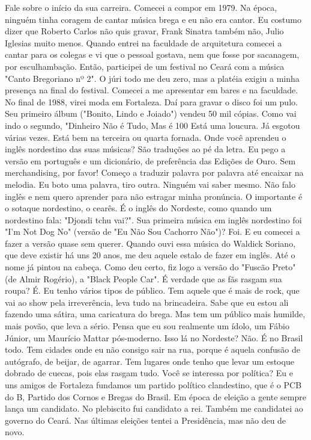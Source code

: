 Fale sobre o início da sua carreira.
Comecei a compor em 1979. Na época, ninguém tinha coragem de cantar música brega e eu não era cantor. Eu costumo dizer que Roberto Carlos não quis gravar, Frank Sinatra também não, Julio Iglesias muito menos. Quando entrei na faculdade de arquitetura comecei a cantar para os colegas e vi que o pessoal gostava, nem que fosse por sacanagem, por esculhambação. Então, participei de um festival no Ceará com a música "Canto Bregoriano nº 2". O júri todo me deu zero, mas a platéia exigiu a minha presença na final do festival. Comecei a me apresentar em bares e na faculdade. No final de 1988, virei moda em Fortaleza. Daí para gravar o disco foi um pulo.
Seu primeiro álbum ("Bonito, Lindo e Joiado") vendeu 50 mil cópias. Como vai indo o segundo, "Dinheiro Não é Tudo, Mas é 100%
Está uma loucura. Já esgotou várias vezes. Está bem na terceira ou quarta fornada.
Onde você aprendeu o inglês nordestino das suas músicas?
São traduções ao pé da letra. Eu pego a versão em português e um dicionário, de preferência das Edições de Ouro. Sem merchandising, por favor! Começo a traduzir palavra por palavra até encaixar na melodia. Eu boto uma palavra, tiro outra. Ninguém vai saber mesmo. Não falo inglês e nem quero aprender para não estragar minha pronúncia. O importante é o sotaque nordestino, o cearês. É o inglês do Nordeste, como quando um nordestino fala: "Djondi tchu vai?".
Sua primeira música em inglês nordestino foi "I'm Not Dog No" (versão de "Eu Não Sou Cachorro Não")?
Foi. E eu comecei a fazer a versão quase sem querer. Quando ouvi essa música do Waldick Soriano, que deve existir há uns 20 anos, me deu aquele estalo de fazer em inglês. Até o nome já pintou na cabeça. Como deu certo, fiz logo a versão do "Fuscão Preto" (de Almir Rogério), a "Black People Car".
É verdade que as fãs rasgam sua roupa?
É. Eu tenho vários tipos de público. Tem aquele que é mais de rock, que vai ao show pela irreverência, leva tudo na brincadeira. Sabe que eu estou ali fazendo uma sátira, uma caricatura do brega. Mas tem um público mais humilde, mais povão, que leva a sério. Pensa que eu sou realmente um ídolo, um Fábio Júnior, um Maurício Mattar pós-moderno.
Isso lá no Nordeste?
Não. É no Brasil todo. Tem cidades onde eu não consigo sair na rua, porque é aquela confusão de autógrafo, de beijar, de agarrar. Tem lugares onde tenho que levar um estoque dobrado de cuecas, pois elas rasgam tudo.
Você se interessa por política?
Eu e uns amigos de Fortaleza fundamos um partido político clandestino, que é o PCB do B, Partido dos Cornos e Bregas do Brasil. Em época de eleição a gente sempre lança um candidato. No plebiscito fui candidato a rei. Também me candidatei ao governo do Ceará. Nas últimas eleições tentei a Presidência, mas não deu de novo.
